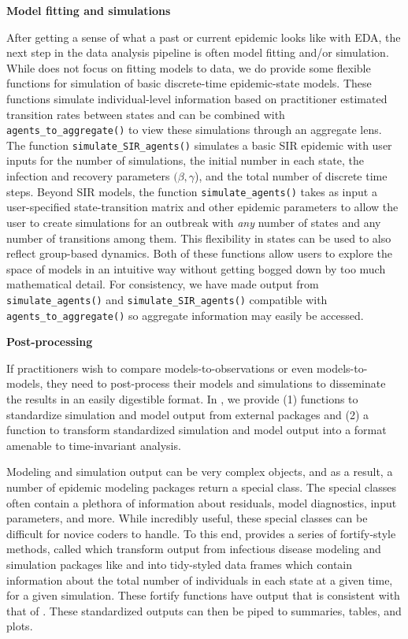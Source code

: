 \documentclass[
  shortnames]{jss}
\begin{document}
\textbf{Model fitting and simulations}

After getting a sense of what a past or current epidemic looks like with
EDA, the next step in the data analysis pipeline is often model fitting
and/or simulation. While  does not focus on fitting
models to data, we do provide some flexible functions for simulation of
basic discrete-time epidemic-state models. These functions simulate
individual-level information based on practitioner estimated transition
rates between states and can be combined with
\texttt{agents\_to\_aggregate()} to view these simulations through an
aggregate lens. The function \texttt{simulate\_SIR\_agents()} simulates
a basic SIR epidemic with user inputs for the number of simulations, the
initial number in each state, the infection and recovery parameters
\((\beta, \gamma\)), and the total number of discrete time steps. Beyond
SIR models, the function \texttt{simulate\_agents()} takes as input a
user-specified state-transition matrix and other epidemic parameters to
allow the user to create simulations for an outbreak with \textit{any}
number of states and any number of transitions among them. This
flexibility in states can be used to also reflect group-based dynamics.
Both of these functions allow users to explore the space of models in an
intuitive way without getting bogged down by too much mathematical
detail. For consistency, we have made output from
\texttt{simulate\_agents()} and \texttt{simulate\_SIR\_agents()}
compatible with \texttt{agents\_to\_aggregate()} so aggregate
information may easily be accessed.

\textbf{Post-processing}

If practitioners wish to compare models-to-observations or even
models-to-models, they need to post-process their models and simulations
to disseminate the results in an easily digestible format. In
, we provide (1) functions to standardize simulation and
model output from external packages and (2) a function to transform
standardized simulation and model output into a format amenable to
time-invariant analysis.

Modeling and simulation output can be very complex objects, and as a
result, a number of epidemic modeling  packages return a
special class. The special classes often contain a plethora of
information about residuals, model diagnostics, input parameters, and
more. While incredibly useful, these special classes can be difficult
for novice coders to handle. To this end,  provides a
series of fortify-style methods, called  which
transform output from infectious disease modeling and simulation
packages like  and  into tidy-styled data frames
which contain information about the total number of individuals in each
state at a given time, for a given simulation. These fortify functions
have output that is consistent with that of
. These standardized outputs can then be
piped to summaries, tables, and plots.
\end{document}
